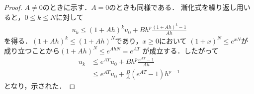 \documentclass[dvipdfmx,autodetect-engine]{jsarticle}
\theoremstyle{remark}
\theoremstyle{definition}
\begin{document}
\begin{proof}
    $A\neq 0$のときに示す．$A=0$のときも同様である．
    漸化式を繰り返し用いると，$0\leq k\leq N$に対して
    \begin{align}
        u_{k} \leq (1+Ah)^{k}u_{0} + Bh^{p} \frac{(1+Ah)^{k}-1}{Ah}
    \end{align}
    を得る．$(1+Ah)^{k} \leq (1+Ah)^{N}$であり，$x\geq 0$において
    $(1+x)^{N} \leq e^{xN}$が成り立つことから$(1+Ah)^{N} \leq e^{AhN} = e^{AT}$
    が成立する．したがって
    \begin{align}
        u_{k} &\leq e^{AT} u_{0} + Bh^{p} \frac{e^{AT}-1}{Ah} \\
        &\leq e^{AT}u_{0} + \frac{B}{A}(e^{AT}-1)h^{p-1}
    \end{align}
    となり，示された．
\end{proof}
\end{document}
